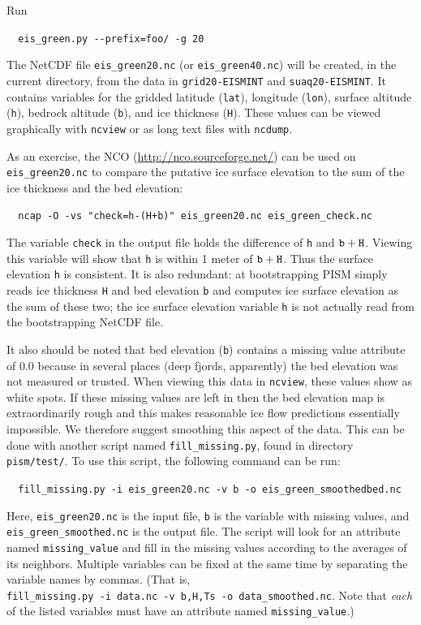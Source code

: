 \documentclass[11pt,final]{amsart}
\begin{document}
Run

\verb|  eis_green.py --prefix=foo/ -g 20|

The NetCDF file \verb|eis_green20.nc| (or \verb|eis_green40.nc|) will be created, in the current directory, from the data in \verb|grid20-EISMINT| and \verb|suaq20-EISMINT|.  It contains variables for the gridded latitude (\verb|lat|), longitude (\verb|lon|), surface altitude (\verb|h|), bedrock altitude (\verb|b|), and ice thickness (\verb|H|).  These values can be viewed graphically with \verb|ncview| or as long text files with \verb|ncdump|.

As an exercise, the NCO (\url{http://nco.sourceforge.net/}) can be used on \verb|eis_green20.nc| to compare the putative ice surface elevation to the sum of the ice thickness and the bed elevation:

\verb|  ncap -O -vs "check=h-(H+b)" eis_green20.nc eis_green_check.nc|

\noindent The variable \verb|check| in the output file holds the difference of \verb|h| and $\verb|b|+\verb|H|$.  Viewing this variable will show that \verb|h| is within 1 meter of $\verb|b|+\verb|H|$.  Thus the surface elevation \verb|h| is consistent.  It is also redundant: at bootstrapping PISM simply reads ice thickness \verb|H| and bed elevation \verb|b| and computes ice surface elevation as the sum of these two; the ice surface elevation variable \verb|h| is not actually read from the bootstrapping NetCDF file.

It also should be noted that bed elevation (\verb|b|) contains a missing value attribute of $0.0$ because in several places (deep fjords, apparently) the bed elevation was not measured or trusted.  When viewing this data in \verb|ncview|, these values show as white spots. If these missing values are left in then the bed elevation map is extraordinarily rough and this makes reasonable ice flow predictions essentially impossible.  We therefore suggest smoothing this aspect of the data.  This can be done with another script named \verb|fill_missing.py|, found in directory \verb|pism/test/|. To use this script, the following command can be run:

\verb|  fill_missing.py -i eis_green20.nc -v b -o eis_green_smoothedbed.nc|

\noindent Here, \verb|eis_green20.nc| is the input file, \verb|b| is the variable with missing values, and \verb|eis_green_smoothed.nc| is the output file. The script will look for an attribute named \verb|missing_value| and fill in the missing values according to the averages of its neighbors.  Multiple variables can be fixed at the same time by separating the variable names by commas.  (That is,\\
\verb|fill_missing.py -i data.nc -v b,H,Ts -o data_smoothed.nc|.  Note that \emph{each} of the listed variables must have an attribute named \verb|missing_value|.)
\end{document}
